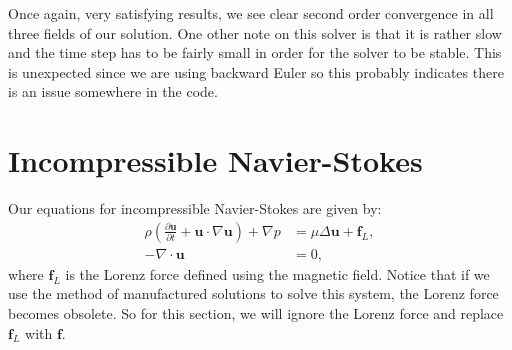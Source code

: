 \documentclass{article}
\begin{document}
                Once again, very satisfying results, we see clear second order convergence in all three fields of our solution. One other note on this solver is that it is rather slow and the time step has to be fairly small in order for the solver to be stable. This is unexpected since we are using backward Euler so this probably indicates there is an issue somewhere in the code. 

            \section*{Incompressible Navier-Stokes}

            Our equations for incompressible Navier-Stokes are given by:
    \begin{align*}
        \rho \left(\frac{\partial \boldsymbol{u}}{\partial t} + \boldsymbol{u} \cdot \nabla \boldsymbol{u}\right) + \nabla p &= \mu \Delta \boldsymbol{u} + \boldsymbol{f}_L,\\
        -\nabla \cdot \boldsymbol{u} &= 0,
    \end{align*}
    where $\boldsymbol{f}_L$ is the Lorenz force defined using the magnetic field. Notice that if we use the method of manufactured solutions to solve this system, the Lorenz force becomes obsolete. So for this section, we will ignore the Lorenz force and replace $\boldsymbol{f}_L$ with $\boldsymbol{f}$.
\end{document}
